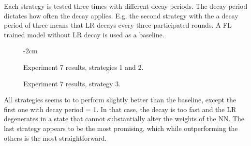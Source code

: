 Each strategy is tested three times with different decay periods. The decay period dictates how often the decay applies. E.g. the second strategy with the a decay period of three means that LR decays every three participated rounds. A FL trained model without LR decay is used as a baseline.
\medskip\medskip
\begin{figure}[H]
    \center
    \addtolength{\leftskip} {-2cm}
    \addtolength{\rightskip}{-2cm}
    
    \caption[Experiment 7 results]{Experiment 7 results, strategies 1 and 2.}
\end{figure}%
\begin{figure}[H]\ContinuedFloat
    \center
    
    \caption[Experiment 7 results]{Experiment 7 results, strategy 3.}
    \label{fig:Experiment 7 results}
\end{figure}
All strategies seems to to perform slightly better than the baseline, except the first one with decay period = 1. In that case, the decay is too fast and the LR degenerates in a state that cannot substantially alter the weights of the NN. The last strategy appears to be the most promising, which while outperforming the others is the most straightforward.


